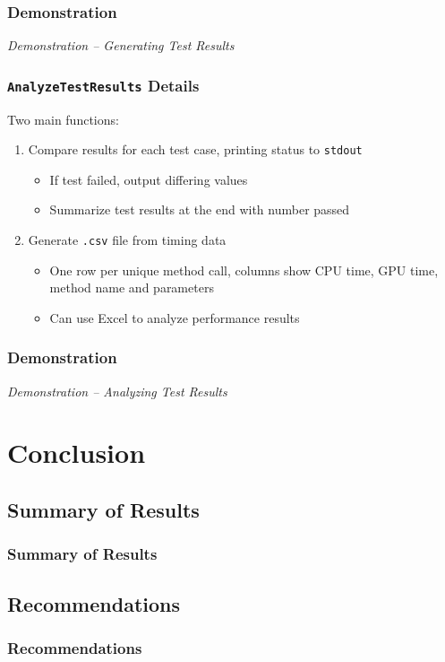 \documentclass{beamer}
\begin{document}
\begin{frame}
\frametitle{Demonstration}
\begin{center}
\emph{Demonstration -- Generating Test Results}
\end{center}
\end{frame}

\begin{frame}
\frametitle{\texttt{AnalyzeTestResults} Details}
Two main functions:
\begin{enumerate}
\item Compare results for each test case, printing status to \texttt{stdout}
\begin{itemize}
\item If test failed, output differing values
\item Summarize test results at the end with number passed
\end{itemize}
\item Generate \texttt{.csv} file from timing data
\begin{itemize}
\item One row per unique method call, columns show CPU time, GPU time, method name and parameters
\item Can use Excel to analyze performance results
\end{itemize}
\end{enumerate}
\end{frame}

\begin{frame}
\frametitle{Demonstration}
\begin{center}
\emph{Demonstration -- Analyzing Test Results}
\end{center}
\end{frame}

\section{Conclusion}
\subsection{Summary of Results}
\begin{frame}
\frametitle{Summary of Results}
\end{frame}

\subsection{Recommendations}
\begin{frame}
\frametitle{Recommendations}
\end{frame}
\end{document}
